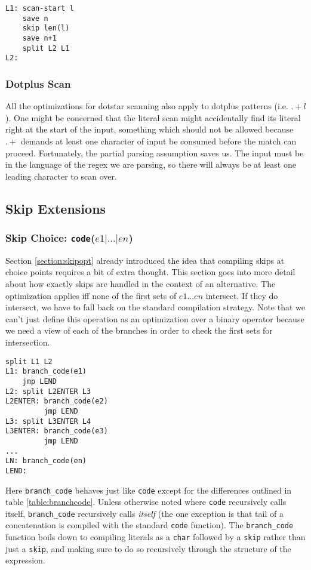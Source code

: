 \begin{verbatim}
L1: scan-start l
    save n
    skip len(l)
    save n+1
    split L2 L1
L2: 
\end{verbatim}

\subsubsection{Dotplus Scan}

All the optimizations for dotstar scanning also apply to dotplus
patterns (i.e. $.+l$). One might be concerned that the literal scan
might accidentally find its literal right at the start of the input,
something which should not be allowed because $.+$ demands at least
one character of input be consumed before the match can proceed.
Fortunately, the partial parsing assumption saves us. The input must
be in the language of the regex we are parsing, so there will always
be at least one leading character to scan over.

\subsection{Skip Extensions}

\subsubsection{Skip Choice: {\tt code}($e1 \rvert \dots \rvert en$)}

Section \ref{section:skipopt} already introduced the idea that
compiling skips at choice points requires a bit of extra thought.
This section goes into more detail about how exactly skips are
handled in the context of an alternative.
The optimization applies iff none of the first sets of $e1 \dots en$
intersect. If they do intersect, we have to fall back on the standard
compilation strategy. Note that we can't just define this operation as
an optimization over a binary operator because we need a view of each
of the branches in order to check the first sets for intersection.

\begin{verbatim}
split L1 L2
L1: branch_code(e1)
    jmp LEND
L2: split L2ENTER L3
L2ENTER: branch_code(e2)
         jmp LEND
L3: split L3ENTER L4
L3ENTER: branch_code(e3)
         jmp LEND
...
LN: branch_code(en)
LEND:
\end{verbatim}

Here \verb'branch_code' behaves just like \verb'code' except 
for the differences outlined in table \ref{table:branchcode}.
Unless otherwise noted where \verb'code' recursively calls
itself, \verb'branch_code' recursively calls \emph{itself}
(the one exception is that tail of a concatenation is
compiled with the standard \verb'code' function).
The \verb'branch_code' function boils down to compiling literals
as a \verb'char' followed by a \verb'skip' rather than just
a \verb'skip', and making sure to do so recursively through
the structure of the expression.

